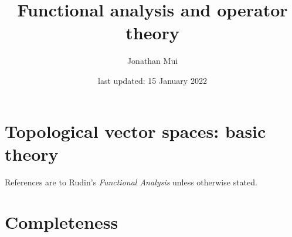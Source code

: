 \documentclass[11pt]{article}
\title{Functional analysis and operator theory}
\author{Jonathan Mui}
\date{last updated: 15 January 2022}
\begin{document}
	
	\maketitle
	
	\tableofcontents
	
	\section{Topological vector spaces: basic theory}
	References are to Rudin's \emph{Functional Analysis} unless otherwise stated.
	
	
	\section{Completeness}
	
	
\end{document}
